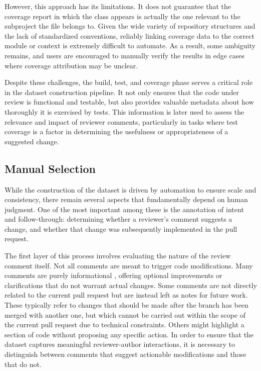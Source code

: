 However, this approach has its limitations. It does not guarantee that the coverage report in which
the class appears is actually the one relevant to the subproject the file belongs to. Given the wide
variety of repository structures and the lack of standardized conventions, reliably linking coverage
data to the correct module or context is extremely difficult to automate. As a result, some
ambiguity remains, and users are encouraged to manually verify the results in edge cases where
coverage attribution may be unclear.

Despite these challenges, the build, test, and coverage phase serves a critical role in the dataset
construction pipeline. It not only ensures that the code under review is functional and testable,
but also provides valuable metadata about how thoroughly it is exercised by tests. This information
is later used to assess the relevance and impact of reviewer comments, particularly in tasks where
test coverage is a factor in determining the usefulness or appropriateness of a suggested change.

\subsection{Manual Selection}
\label{sec:manual-selection}

While the construction of the dataset is driven by automation to ensure scale and consistency, there
remain several aspects that fundamentally depend on human judgment. One of the most important among
these is the annotation of intent and follow-through: determining whether a reviewer’s comment
suggests a change, and whether that change was subsequently implemented in the pull request.

The first layer of this process involves evaluating the nature of the review comment itself. Not all
comments are meant to trigger code modifications. Many comments are purely informational , offering
optional improvements or clarifications that do not warrant actual changes. Some comments are not
directly related to the current pull request but are instead left as notes for future work. These
typically refer to changes that should be made after the branch has been merged with another one,
but which cannot be carried out within the scope of the current pull request due to technical
constraints. Others might highlight a section of code without proposing any specific action. In
order to ensure that the dataset captures meaningful reviewer-author interactions, it is necessary
to distinguish between comments that suggest actionable modifications and those that do not.

